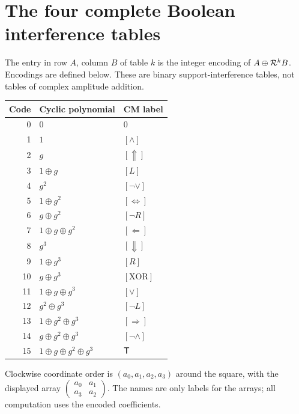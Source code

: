 \section{The four complete Boolean interference tables}\label{app:tables}
The entry in row $A$, column $B$ of table $k$ is the integer encoding of $A\oplus\mathcal R^kB$. Encodings are defined below. These are binary support-interference tables, not tables of complex amplitude addition.
\begin{center}\small\begin{tabular}{@{}rll@{}}\toprule Code & Cyclic polynomial & CM label\\\midrule
0 & $0$ & $0$\\
1 & $1$ & $[\land]$\\
2 & $g$ & $[\Uparrow]$\\
3 & $1\oplus g$ & $[L]$\\
4 & $g^2$ & $[\neg\lor]$\\
5 & $1\oplus g^2$ & $[\Leftrightarrow]$\\
6 & $g\oplus g^2$ & $[\neg R]$\\
7 & $1\oplus g\oplus g^2$ & $[\Leftarrow]$\\
8 & $g^3$ & $[\Downarrow]$\\
9 & $1\oplus g^3$ & $[R]$\\
10 & $g\oplus g^3$ & $[\mathrm{XOR}]$\\
11 & $1\oplus g\oplus g^3$ & $[\lor]$\\
12 & $g^2\oplus g^3$ & $[\neg L]$\\
13 & $1\oplus g^2\oplus g^3$ & $[\Rightarrow]$\\
14 & $g\oplus g^2\oplus g^3$ & $[\neg\land]$\\
15 & $1\oplus g\oplus g^2\oplus g^3$ & $\mathsf T$\\
\bottomrule\end{tabular}\end{center}
Clockwise coordinate order is $(a_0,a_1,a_2,a_3)$ around the square, with the displayed array $\begin{pmatrix}a_0&a_1\\a_3&a_2\end{pmatrix}$. The names are only labels for the arrays; all computation uses the encoded coefficients.
\clearpage
